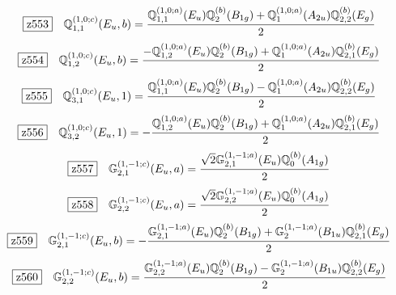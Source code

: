 \documentclass[fleqn,10pt,landscape]{jsarticle}
\begin{document}
\begin{dmath*}
\hspace*{3mm}\fbox{z553}\quad \mathbb{Q}_{1,1}^{(1,0;c)}(E_{u},b)=\frac{\mathbb{Q}_{1,1}^{(1,0;a)}(E_{u}) \mathbb{Q}_{2}^{(b)}(B_{1g}) + \mathbb{Q}_{1}^{(1,0;a)}(A_{2u}) \mathbb{Q}_{2,2}^{(b)}(E_{g})}{2}
\end{dmath*}
\begin{dmath*}
\hspace*{3mm}\fbox{z554}\quad \mathbb{Q}_{1,2}^{(1,0;c)}(E_{u},b)=\frac{- \mathbb{Q}_{1,2}^{(1,0;a)}(E_{u}) \mathbb{Q}_{2}^{(b)}(B_{1g}) + \mathbb{Q}_{1}^{(1,0;a)}(A_{2u}) \mathbb{Q}_{2,1}^{(b)}(E_{g})}{2}
\end{dmath*}
\begin{dmath*}
\hspace*{3mm}\fbox{z555}\quad \mathbb{Q}_{3,1}^{(1,0;c)}(E_{u},1)=\frac{\mathbb{Q}_{1,1}^{(1,0;a)}(E_{u}) \mathbb{Q}_{2}^{(b)}(B_{1g}) - \mathbb{Q}_{1}^{(1,0;a)}(A_{2u}) \mathbb{Q}_{2,2}^{(b)}(E_{g})}{2}
\end{dmath*}
\begin{dmath*}
\hspace*{3mm}\fbox{z556}\quad \mathbb{Q}_{3,2}^{(1,0;c)}(E_{u},1)=- \frac{\mathbb{Q}_{1,2}^{(1,0;a)}(E_{u}) \mathbb{Q}_{2}^{(b)}(B_{1g}) + \mathbb{Q}_{1}^{(1,0;a)}(A_{2u}) \mathbb{Q}_{2,1}^{(b)}(E_{g})}{2}
\end{dmath*}
\begin{dmath*}
\hspace*{3mm}\fbox{z557}\quad \mathbb{G}_{2,1}^{(1,-1;c)}(E_{u},a)=\frac{\sqrt{2} \mathbb{G}_{2,1}^{(1,-1;a)}(E_{u}) \mathbb{Q}_{0}^{(b)}(A_{1g})}{2}
\end{dmath*}
\begin{dmath*}
\hspace*{3mm}\fbox{z558}\quad \mathbb{G}_{2,2}^{(1,-1;c)}(E_{u},a)=\frac{\sqrt{2} \mathbb{G}_{2,2}^{(1,-1;a)}(E_{u}) \mathbb{Q}_{0}^{(b)}(A_{1g})}{2}
\end{dmath*}
\begin{dmath*}
\hspace*{3mm}\fbox{z559}\quad \mathbb{G}_{2,1}^{(1,-1;c)}(E_{u},b)=- \frac{\mathbb{G}_{2,1}^{(1,-1;a)}(E_{u}) \mathbb{Q}_{2}^{(b)}(B_{1g}) + \mathbb{G}_{2}^{(1,-1;a)}(B_{1u}) \mathbb{Q}_{2,1}^{(b)}(E_{g})}{2}
\end{dmath*}
\begin{dmath*}
\hspace*{3mm}\fbox{z560}\quad \mathbb{G}_{2,2}^{(1,-1;c)}(E_{u},b)=\frac{\mathbb{G}_{2,2}^{(1,-1;a)}(E_{u}) \mathbb{Q}_{2}^{(b)}(B_{1g}) - \mathbb{G}_{2}^{(1,-1;a)}(B_{1u}) \mathbb{Q}_{2,2}^{(b)}(E_{g})}{2}
\end{dmath*}
\end{document}
